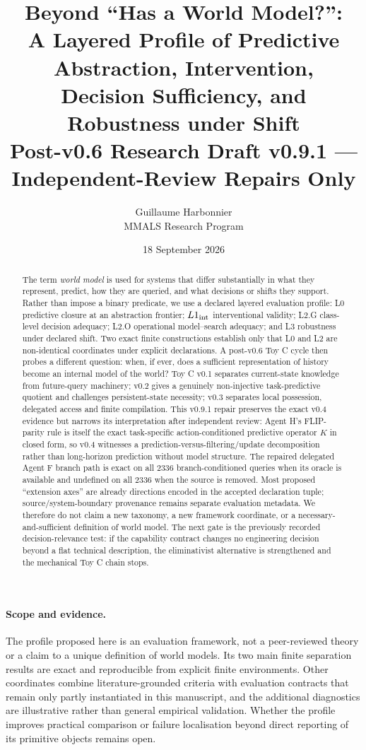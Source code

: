 \documentclass[10pt]{article}
\title{\textbf{Beyond ``Has a World Model?'':}\\
A Layered Profile of Predictive Abstraction, Intervention,\\
Decision Sufficiency, and Robustness under Shift\\[0.35em]
\large Post-v0.6 Research Draft v0.9.1 --- Independent-Review Repairs Only}
\author{Guillaume Harbonnier\\MMALS Research Program}
\date{18 September 2026}
\begin{document}
\maketitle


\begin{abstract}
The term \emph{world model} is used for systems that differ substantially in what they represent, predict, how they are queried, and what decisions or shifts they support. Rather than impose a binary predicate, we use a declared layered evaluation profile: L0 predictive closure at an abstraction frontier; $L1_{\rm int}$ interventional validity; L2.G class-level decision adequacy; L2.O operational model--search adequacy; and L3 robustness under declared shift. Two exact finite constructions establish only that L0 and L2 are non-identical coordinates under explicit declarations. A post-v0.6 Toy C cycle then probes a different question: when, if ever, does a sufficient representation of history become an internal model of the world? Toy C v0.1 separates current-state knowledge from future-query machinery; v0.2 gives a genuinely non-injective task-predictive quotient and challenges persistent-state necessity; v0.3 separates local possession, delegated access and finite compilation. This v0.9.1 repair preserves the exact v0.4 evidence but narrows its interpretation after independent review: Agent H's FLIP-parity rule is itself the exact task-specific action-conditioned predictive operator $K$ in closed form, so v0.4 witnesses a prediction-versus-filtering/update decomposition rather than long-horizon prediction without model structure. The repaired delegated Agent F branch path is exact on all 2336 branch-conditioned queries when its oracle is available and undefined on all 2336 when the source is removed. Most proposed ``extension axes'' are already directions encoded in the accepted declaration tuple; source/system-boundary provenance remains separate evaluation metadata. We therefore do not claim a new taxonomy, a new framework coordinate, or a necessary-and-sufficient definition of world model. The next gate is the previously recorded decision-relevance test: if the capability contract changes no engineering decision beyond a flat technical description, the eliminativist alternative is strengthened and the mechanical Toy C chain stops.
\end{abstract}

\paragraph{Scope and evidence.}
The profile proposed here is an evaluation framework, not a peer-reviewed theory or a claim to a unique definition of world models. Its two main finite separation results are exact and reproducible from explicit finite environments. Other coordinates combine literature-grounded criteria with evaluation contracts that remain only partly instantiated in this manuscript, and the additional diagnostics are illustrative rather than general empirical validation. Whether the profile improves practical comparison or failure localisation beyond direct reporting of its primitive objects remains open.
\end{document}
